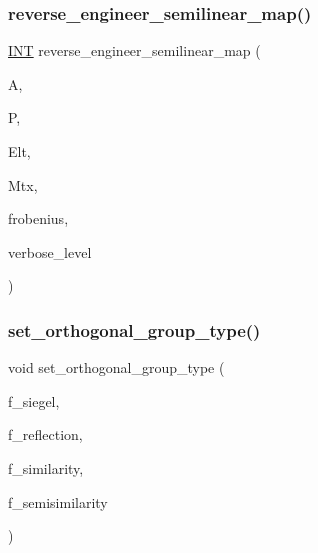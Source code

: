 \mbox{\label{action__global_8_c_ab746dde308059893cd75074a5d21a60d}} 
\subsubsection{\texorpdfstring{reverse\+\_\+engineer\+\_\+semilinear\+\_\+map()}{reverse\_engineer\_semilinear\_map()}}
{\footnotesize\ttfamily \mbox{\hyperlink{galois_8h_a09fddde158a3a20bd2dcadb609de11dc}{I\+NT}} reverse\+\_\+engineer\+\_\+semilinear\+\_\+map (\begin{DoxyParamCaption}\item[{\mbox{\hyperlink{classaction}{action}} $\ast$}]{A,  }\item[{\mbox{\hyperlink{classprojective__space}{projective\+\_\+space}} $\ast$}]{P,  }\item[{\mbox{\hyperlink{galois_8h_a09fddde158a3a20bd2dcadb609de11dc}{I\+NT}} $\ast$}]{Elt,  }\item[{\mbox{\hyperlink{galois_8h_a09fddde158a3a20bd2dcadb609de11dc}{I\+NT}} $\ast$}]{Mtx,  }\item[{\mbox{\hyperlink{galois_8h_a09fddde158a3a20bd2dcadb609de11dc}{I\+NT}} \&}]{frobenius,  }\item[{\mbox{\hyperlink{galois_8h_a09fddde158a3a20bd2dcadb609de11dc}{I\+NT}}}]{verbose\+\_\+level }\end{DoxyParamCaption})}

\mbox{\label{action__global_8_c_a5ba060f4315e7880d5ab19ef16300a40}} 
\subsubsection{\texorpdfstring{set\+\_\+orthogonal\+\_\+group\+\_\+type()}{set\_orthogonal\_group\_type()}}
{\footnotesize\ttfamily void set\+\_\+orthogonal\+\_\+group\+\_\+type (\begin{DoxyParamCaption}\item[{\mbox{\hyperlink{galois_8h_a09fddde158a3a20bd2dcadb609de11dc}{I\+NT}}}]{f\+\_\+siegel,  }\item[{\mbox{\hyperlink{galois_8h_a09fddde158a3a20bd2dcadb609de11dc}{I\+NT}}}]{f\+\_\+reflection,  }\item[{\mbox{\hyperlink{galois_8h_a09fddde158a3a20bd2dcadb609de11dc}{I\+NT}}}]{f\+\_\+similarity,  }\item[{\mbox{\hyperlink{galois_8h_a09fddde158a3a20bd2dcadb609de11dc}{I\+NT}}}]{f\+\_\+semisimilarity }\end{DoxyParamCaption})}

